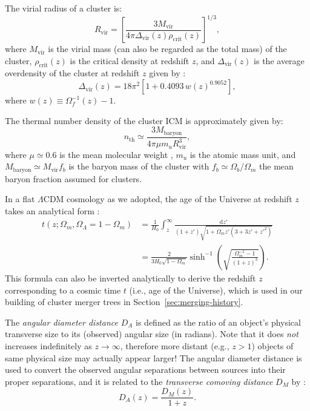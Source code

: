 \documentclass[modern]{aastex61}
\newcommand{\R}[1]{\mathrm{#1}}
\newcommand{\D}[1]{\R{d} #1}
\newcommand{\lcdm}{$\Lambda$CDM}
\begin{document}
The virial radius of a cluster is:
\begin{equation}
  \label{eq:radius-virial}
  R_{\R{vir}} = \left[
    \frac{3 M_{\R{vir}}}{4\pi \Delta_{\R{vir}}(z) \rho_{\R{crit}}(z)}
  \right]^{1/3},
\end{equation}
where $M_{\R{vir}}$ is the virial mass (can also be regarded as
the total mass) of the cluster,
$\rho_{\R{crit}}(z)$ is the critical density at redshift $z$,
and $\Delta_{\R{vir}}(z)$ is the average overdensity of the cluster
at redshift $z$ given by \citep{kitayama1996,cassano2005}:
\begin{equation}
  \label{eq:delta-vir}
  \Delta_{\R{vir}}(z) = 18\pi^2 \left[ 1 + 0.4093 \, w(z)^{0.9052} \right],
\end{equation}
where $w(z) \equiv \Omega_f^{-1}(z) - 1$.

The thermal number density of the cluster ICM is approximately given by:
\begin{equation}
  \label{eq:nth}
  n_{\R{th}} \simeq
    \frac{3 M_{\R{baryon}}}{4\pi \mu m_u R_{\R{vir}}^3},
\end{equation}
where $\mu \simeq 0.6$ is the mean molecular weight \citep{ettori2013},
$m_u$ is the atomic mass unit,
and $M_{\R{baryon}} \simeq M_{\R{vir}} f_b$ is the baryon mass
of the cluster with $f_b \simeq \Omega_b / \Omega_m$ the mean baryon
fraction assumed for clusters.

In a flat \lcdm{} cosmology as we adopted, the age of the Universe
at redshift $z$ takes an analytical form
\citep[their Equation~(18)]{thomas2000}:
\begin{align}
  \label{eq:universe-age}
  t(z; \Omega_m, \Omega_{\Lambda}=1-\Omega_m)
    & = \frac{1}{H_0} \int_z^{\infty}
      \frac{\D{z'}}{(1+z')\sqrt{1 + \Omega_m z' (3+3z'+z'^2)}} \nonumber \\
    & = \frac{2}{3 H_0 \sqrt{1-\Omega_m}} \sinh^{-1} \!\left(
      \sqrt{\frac{\Omega_m^{-1} - 1}{(1+z)^3}} \right).
\end{align}
This formula can also be inverted analytically to derive the redshift
$z$ corresponding to a cosmic time $t$ (i.e., age of the Universe),
which is used in our building of cluster merger trees
in Section~\ref{sec:merging-history}.

The \emph{angular diameter distance} $D_A$ is defined as the ratio of
an object's physical transverse size to its (observed) angular size
(in radians).  Note that it does \emph{not} increases indefinitely
as $z \to \infty$, therefore more distant (e.g., $z > 1$)
objects of same physical size may actually appear larger!
The angular diameter distance is used to convert the observed angular
separations between sources into their proper separations, and it is
related to the \emph{transverse comoving distance} $D_M$ by
\citep{weinberg1972,peebles1993,hogg1999}:
\begin{equation}
  \label{eq:da-dm}
  D_A(z) = \frac{D_M(z)}{1 + z}.
\end{equation}
\end{document}
